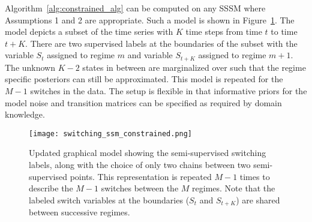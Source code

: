  Algorithm~\ref{alg:constrained_alg} can be computed on any SSSM where Assumptions 1 and 2 are appropriate. Such a model is shown in Figure~\ref{fig:updated_ssm_graphical_model}. The model depicts a subset of the time series with $K$ time steps from time $t$ to time $t+K$. There are two supervised labels at the boundaries of the subset with the variable $S_t$ assigned to regime $m$ and variable $S_{t+K}$ assigned to regime $m+1$. The unknown $K-2$ states in between are marginalized over such that the regime specific posteriors can still be approximated. This model is repeated for the $M-1$ switches in the data. The setup is flexible in that informative priors for the model noise and transition matrices can be specified as required by domain knowledge.

\begin{figure}
  \centering
  \texttt{[image: switching\_ssm\_constrained.png]}
  \caption{Updated graphical model showing the semi-supervised switching labels, along with the choice of only two chains between two semi-supervised points. This representation is repeated $M-1$ times to describe the $M-1$ switches between the $M$ regimes. Note that the labeled switch variables at the boundaries ($S_t$ and $S_{t+K}$) are shared between successive regimes.}
  \label{fig:updated_ssm_graphical_model}
\end{figure}
